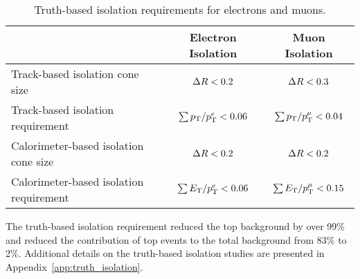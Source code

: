 \begin{table}[htp]
  \centering
  \begin{tabular}{l|c|c}
    ~       &   Electron Isolation & Muon Isolation \\
    \hline\hline
    Track-based isolation cone size   	    &   $\Delta R < 0.2$          & $\Delta R < 0.3$ \\
    Track-based isolation requirement       &   $\sum p_{\mathrm{T}}/p_{\mathrm{T}}^{e} <  0.06$ & $\sum p_{\mathrm{T}}/p_{\mathrm{T}}^{\mu} <  0.04$	\\
    Calorimeter-based isolation cone size   &   $\Delta R < 0.2$	         & $\Delta R < 0.2$\\
    Calorimeter-based isolation requirement &   $\sum E_{\mathrm{T}}/p_{\mathrm{T}}^{e} <  0.06$ & $\sum E_{\mathrm{T}}/p_{\mathrm{T}}^{\mu} <  0.15$	\\
    \hline
  \end{tabular}
  \caption{Truth-based isolation requirements for electrons and muons.} 
  \label{tab:truth_iso_definition}
\end{table}

The truth-based isolation requirement reduced the top background by over 99\% and reduced the contribution of top events to the total background from 83\% to 2\%.  Additional details on the truth-based isolation studies are presented in Appendix~\ref{app:truth_isolation}.
